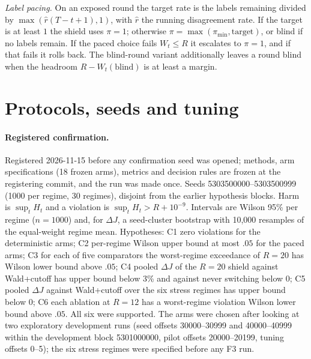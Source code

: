 \documentclass{article}
\theoremstyle{plain}
\theoremstyle{definition}
\begin{document}
\emph{Label pacing.} On an exposed round the target rate is the labels remaining divided by $\max(\hat r(T-t+1),1)$, with $\hat r$ the running disagreement rate. If the target is at least $1$ the shield uses $\pi=1$; otherwise $\pi=\max(\pi_{\min},\text{target})$, or blind if no labels remain. If the paced choice fails $W_t\le R$ it escalates to $\pi=1$, and if that fails it rolls back. The blind-round variant additionally leaves a round blind when the headroom $R-W_t(\text{blind})$ is at least a margin.

\section{Protocols, seeds and tuning}\label{app:protocols}
\paragraph{Registered confirmation.}
Registered 2026-11-15 before any confirmation seed was opened; methods, arm specifications (18 frozen arms), metrics and decision rules are frozen at the registering commit, and the run was made once. Seeds 5303500000--5303500999 (1000 per regime, 30 regimes), disjoint from the earlier hypothesis blocks. Harm is $\sup_tH_t$ and a violation is $\sup_tH_t>R+10^{-9}$. Intervals are Wilson 95\% per regime ($n=1000$) and, for $\Delta J$, a seed-cluster bootstrap with 10{,}000 resamples of the equal-weight regime mean. Hypotheses: C1 zero violations for the deterministic arms; C2 per-regime Wilson upper bound at most $.05$ for the paced arms; C3 for each of five comparators the worst-regime exceedance of $R=20$ has Wilson lower bound above $.05$; C4 pooled $\Delta J$ of the $R=20$ shield against Wald+cutoff has upper bound below 3\% and against never switching below $0$; C5 pooled $\Delta J$ against Wald+cutoff over the six stress regimes has upper bound below $0$; C6 each ablation at $R=12$ has a worst-regime violation Wilson lower bound above $.05$. All six were supported. The arms were chosen after looking at two exploratory development runs (seed offsets 30000--30999 and 40000--40999 within the development block 5301000000, pilot offsets 20000--20199, tuning offsets 0--5); the six stress regimes were specified before any F3 run.
\end{document}
